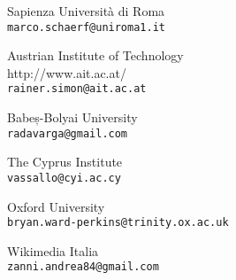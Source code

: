 \begin{contributors}
{Sapienza Università di Roma	   \\
\texttt{marco.schaerf@uniroma1.it	}
}
	

{  Austrian Institute of Technology \\
{http://www.ait.ac.at/}	\\
\texttt{rainer.simon@ait.ac.at}
}
	
		
		
		

{  Babeș-Bolyai University	 \\
\texttt{radavarga@gmail.com	}
}
		


{  The Cyprus Institute	 \\
\texttt{vassallo@cyi.ac.cy	}
}


{Oxford University	   \\
\texttt{bryan.ward-perkins@trinity.ox.ac.uk}
}



{ Wikimedia Italia	  \\
\texttt{zanni.andrea84@gmail.com}
}



		


\end{contributors}